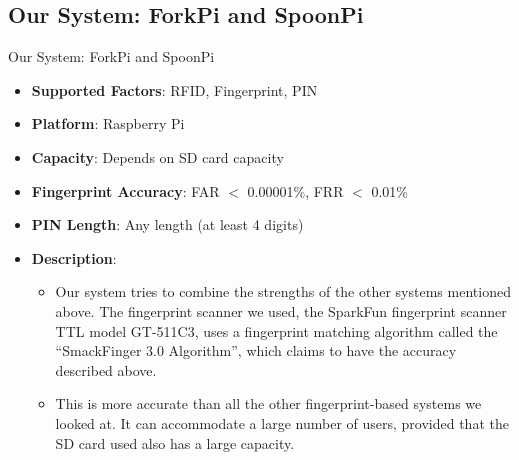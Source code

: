 \subsection{Our System: ForkPi and SpoonPi}
\begin{frame}{Our System: ForkPi and SpoonPi}
\begin{itemize}
    \item<1-> \textbf{Supported Factors}: RFID, Fingerprint, PIN
    \item<2-> \textbf{Platform}: Raspberry Pi
    \item<3-> \textbf{Capacity}: Depends on SD card capacity
    \item<4-> \textbf{Fingerprint Accuracy}: FAR $<$ 0.00001\%, FRR $<$ 0.01\%
    \item<5-> \textbf{PIN Length}: Any length (at least 4 digits)
    \item<6-> \textbf{Description}:
    \begin{itemize}
	    \item<7-> \scriptsize{Our system tries to combine the strengths of the other systems mentioned above. The fingerprint scanner we used, the SparkFun fingerprint scanner TTL model GT-511C3, uses a fingerprint matching algorithm called the ``SmackFinger 3.0 Algorithm'', which claims to have the accuracy described above.}
	    \item<8-> \scriptsize{This is more accurate than all the other fingerprint-based systems we looked at. It can accommodate a large number of users, provided that the SD card used also has a large capacity.}
	\end{itemize}
\end{itemize}
\end{frame}